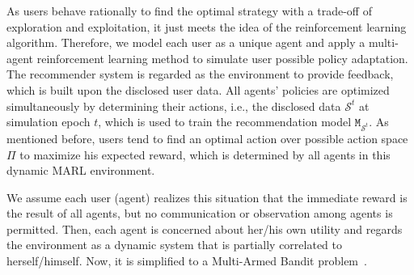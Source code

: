 As users behave rationally to find the optimal strategy with a trade-off of exploration and exploitation, it just meets the idea of the reinforcement learning algorithm. 
Therefore, we model each user as a unique agent and apply a multi-agent reinforcement learning method to simulate user possible policy adaptation. 
The recommender system is regarded as the environment to provide feedback, which is built upon the disclosed user data.
All agents' policies are optimized simultaneously by determining their actions, i.e., the disclosed data $\scriptstyle \mathcal{S}^t$ at simulation epoch $t$, which is used to train the recommendation model $\texttt{M}_{{\scriptscriptstyle \mathcal{S}}^{t}}$.
As mentioned before, users tend to find an optimal action over possible action space $\Pi$ to maximize his expected reward, which is determined by all agents in this dynamic MARL environment. 


We assume each user (agent) realizes this situation that the immediate reward is the result of all agents, but no communication or observation among agents is permitted. 
Then, each agent is concerned about her/his own utility and regards the environment as a dynamic system that is partially correlated to herself/himself. 
Now, it is simplified to a Multi-Armed Bandit problem~\cite{katehakis1987multi}.


